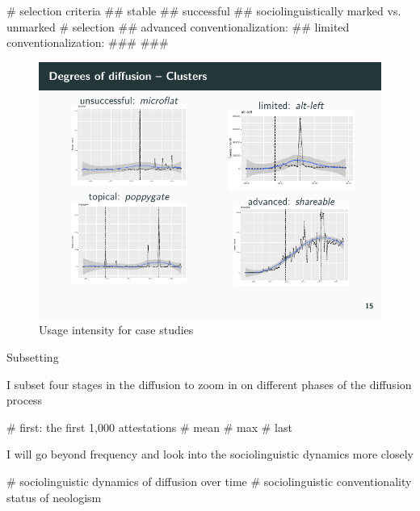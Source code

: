 \documentclass[
  a4paper,
  ]{scrartcl}
\begin{document}
    \begin{easylist}[itemize]
      # selection criteria
        ## stable
        ## successful
        ## sociolinguistically marked vs. unmarked
      # selection
        ## advanced conventionalization: 
        ## limited conventionalization:
          ### 
          ### 
    \end{easylist}

    \begin{figure}[H]
      \centering
      \includegraphics[width=\linewidth, height=.8\textheight, keepaspectratio]{images/ui_cases.pdf}
      \caption{Usage intensity for case studies}
    \end{figure}

    Subsetting

      I subset four stages in the diffusion to zoom in on different phases of the diffusion process 

      \begin{easylist}[itemize]
        # first: the first 1,000 attestations
        # mean
        # max
        # last
      \end{easylist}

    I will go beyond frequency and look into the sociolinguistic dynamics more closely

    \begin{easylist}[itemize]
      # sociolinguistic dynamics of diffusion over time
      # sociolinguistic conventionality status of neologism
    \end{easylist}
\end{document}
